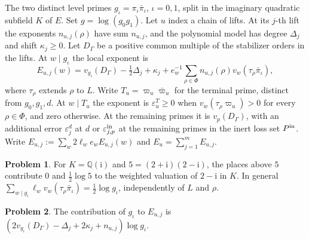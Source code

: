 \documentclass[reqno]{amsart}
\theoremstyle{definition}
\newtheorem{problem}{Problem}[section]
\theoremstyle{plain}
\newcommand{\Q}{\mathbb Q}
\begin{document}
The two distinct level primes \(g_\iota=\pi_\iota\bar\pi_\iota\), \(\iota=0,1\), split in the imaginary quadratic subfield \(K\) of \(E\).  Set \(g=\log(g_0g_1)\).  Let \(u\) index a chain of lifts.  At its \(j\)-th lift the exponents \(n_{u,j}(\rho)\) have sum \(n_{u,j}\), and the polynomial model has degree \(\Delta_j\) and shift \(\kappa_j\ge0\).  Let \(D_\Gamma\) be a positive common multiple of the stabilizer orders in the lifts.  At \(w\mid g_\iota\) the local exponent is \cite[Def.~16.5]{Adr}
\[
 E_{u,j}(w)=v_{g_\iota}(D_\Gamma)-\tfrac12\Delta_j+\kappa_j+
 e_w^{-1}\sum_{\rho\in\Phi}n_{u,j}(\rho)v_w(\tau_\rho\bar\pi_\iota),
\]
where \(\tau_\rho\) extends \(\rho\) to \(L\).  Write \(T_u=\varpi_u\bar\varpi_u\) for the terminal prime, distinct from \(g_0,g_1,d\).  At \(w\mid T_u\) the exponent is \(\varepsilon^T_u\ge0\) when \(v_w(\tau_\rho\varpi_u)>0\) for every \(\rho\in\Phi\), and zero otherwise.  At the remaining primes it is \(v_p(D_\Gamma)\), with an additional error \(\varepsilon^d_j\) at \(d\) or \(\varepsilon^{\rm in}_{j,p}\) at the remaining primes in the inert loss set \(P^{\rm in}\).  Write \(E_{u,j}:=\sum_w2\ell_we_w E_{u,j}(w)\) and \(E_u=\sum_{j=1}^m E_{u,j}\).

\begin{problem}\label{pr:half-norm}
For \(K=\Q(\mathrm i)\) and \(5=(2+\mathrm i)(2-\mathrm i)\), the places above \(5\) contribute \(0\) and \(\tfrac12\log5\) to the weighted valuation of \(2-\mathrm i\) in \(K\).  In general
\(\sum_{w\mid g_\iota}\ell_wv_w(\tau_\rho\bar\pi_\iota)=\tfrac12\log g_\iota\), independently of \(L\) and \(\rho\).
\end{problem}

\begin{problem}\label{pr:level}
The contribution of \(g_\iota\) to \(E_{u,j}\) is
\((2v_{g_\iota}(D_\Gamma)-\Delta_j+2\kappa_j+n_{u,j})\log g_\iota\).
\end{problem}
\end{document}
